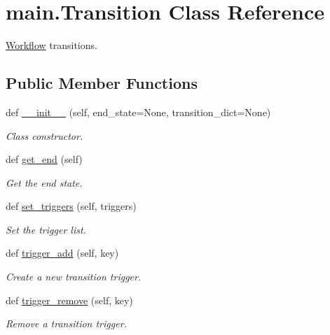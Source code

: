 \hypertarget{classmain_1_1_transition}{}\section{main.\+Transition Class Reference}
\label{classmain_1_1_transition}


\hyperlink{classmain_1_1_workflow}{Workflow} transitions.  


\subsection*{Public Member Functions}
\begin{DoxyCompactItemize}
\item 
def \hyperlink{classmain_1_1_transition_a9c17de405e211cf1f3c2f05f584c4675}{\+\_\+\+\_\+init\+\_\+\+\_\+} (self, end\+\_\+state=None, transition\+\_\+dict=None)
\begin{DoxyCompactList}\small\item\em Class constructor. \end{DoxyCompactList}\item 
def \hyperlink{classmain_1_1_transition_aa804e95ea6a0d9a9566785f08a5931cc}{get\+\_\+end} (self)
\begin{DoxyCompactList}\small\item\em Get the end state. \end{DoxyCompactList}\item 
def \hyperlink{classmain_1_1_transition_a8dc53c69ee3381f037ec690f53e0fcd4}{set\+\_\+triggers} (self, triggers)
\begin{DoxyCompactList}\small\item\em Set the trigger list. \end{DoxyCompactList}\item 
def \hyperlink{classmain_1_1_transition_adb1b399d2905614b0792a6cbfe4f1a92}{trigger\+\_\+add} (self, key)
\begin{DoxyCompactList}\small\item\em Create a new transition trigger. \end{DoxyCompactList}\item 
def \hyperlink{classmain_1_1_transition_ae5174ec35a1ddd024f7437941f1a7e8e}{trigger\+\_\+remove} (self, key)
\begin{DoxyCompactList}\small\item\em Remove a transition trigger. \end{DoxyCompactList}\item 

\end{DoxyCompactItemize}
